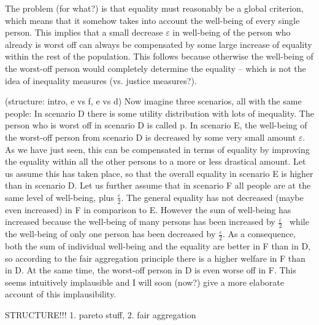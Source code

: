  The problem (for what?) is that equality must reasonably be a global criterion, which means that it somehow takes into account the well-being of every single person. This implies that a small decrease $\varepsilon $ in well-being of the person who already is worst off can always be compensated by some large increase of equality within the rest of the population. This follows because otherwise the well-being of the worst-off person would completely determine the equality – which is not the idea of inequality measures (vs. justice measures?).  

 (structure: intro, e vs f, e vs d) Now imagine three scenarios, all with the same people: In scenario D there is some utility distribution with lots of inequality. The person who is worst off in scenario D is called p. In scenario E, the well-being of the worst-off person from scenario D is decreased by some very small amount $\varepsilon $. As we have just seen, this can be compensated in terms of equality by improving the equality within all the other persons to a more or less drastical amount. Let us assume this has taken place, so that the overall equality in scenario E is higher than in scenario D. Let us further assume that in scenario F all people are at the same level of well-being, plus  $\frac{\varepsilon } 2$. The general equality has not decreased (maybe even increased) in F in comparison to E. However the sum of well-being has increased because the well-being of many persons has been increased by  $\frac{\varepsilon } 2$ \ while the well-being of only one person has been decreased by  $\frac{\varepsilon } 2$. As a consequence, both the sum of individual well-being and the equality are better in F than in D, so according to the fair aggregation principle there is a higher welfare in F than in D. At the same time, the worst-off person in D is even worse off in F. This seems intuitively implausible and I will soon (now?) give a more elaborate account of this implausibility.  

 STRUCTURE!!! 1. pareto stuff, 2. fair aggregation 

